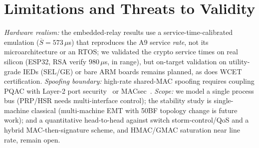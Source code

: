 \documentclass[journal]{IEEEtran}
\begin{document}
\section{Limitations and Threats to Validity}
\label{sec:limitations}
\textit{Hardware realism:} the embedded-relay results use a service-time-calibrated emulation ($\overline{S}=573\,\mu$s) that reproduces the A9 service \emph{rate}, not its microarchitecture or an RTOS; we validated the crypto service times on real silicon (ESP32, RSA verify $980\,\mu$s, in range), but on-target validation on utility-grade IEDs (SEL/GE) or bare ARM boards remains planned, as does WCET certification. \textit{Spoofing boundary:} high-rate shared-MAC spoofing requires coupling PQAC with Layer-2 port security~\cite{ieee8021x} or MACsec~\cite{ieee8021ae}. \textit{Scope:} we model a single process bus (PRP/HSR needs multi-interface control); the stability study is single-machine classical (multi-machine EMT with 50BF topology change is future work); and a quantitative head-to-head against switch storm-control/QoS and a hybrid MAC-then-signature scheme, and HMAC/GMAC saturation near line rate, remain open.

\end{document}
